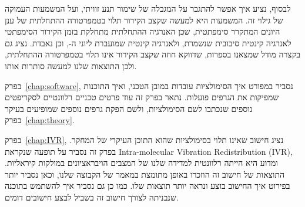 {לבסוף, נציע איך אפשר להתגבר על המגבלה של שימור תנע זוויתי, ועל המשמעות העמוקה של גילוי זה. המשמעות היא למעשה שקצב הקירור תלוי בטמפרטורה ההתחלתית של ענן היונים המתקרר סימפתטית, שכן האנרגיה ההתחלתית מתחלקת בזמן הקירור הסימפתטי לאנרגיה קינטית סיבובית שנשמרת, ולאנרגיה קינטית שמועברת ליוני ה-\textenglish{}, וכן נאבדת. נציג גם בקצרה מודל שמצאנו בספרות\cite{BabaWakiSympatheticCooling}, שדווקא חוזה שקצב הקירור אינו תלוי בטמפרטורה ההתחלתית, ולכן התוצאות שלנו למעשה סותרות אותו.

בפרק~\ref{chap:software}, נסביר במפורט איך הסימולציות עובדות במובן הטכני, ואיך התוכנות שמפיקות את הגרפים פועלות. נתאר בפרק זה עוד פרטים טכניים רלוונטיים לסקריפטים נוספים שנכתבו לשם הסימולציות, ולשם הפקת גרפים נוספים שמופיעים בעיקר בפרק~\ref{chap:theory}.

בפרק~\textenglish{\ref{chap:IVR}}, נציג חישוב שאינו תלוי בסימולציות שהוא התוכן העיקרי של המחקר. בפרק זה נסביר על תופעה שנקראת \textenglish{Intra-molecular Vibration Redistribution (IVR)}, ומדוע היא הייתה רלוונטית למדידה שלנו של המצבים הויבראציונים במולקות קיראליות. התוצאות של חישוב זה הוזכרו באופן מתומצת במאמר של הקבוצה שלנו\cite{IVR_article}, וכאן נסביר יותר בפירוט איך החישוב בוצע ונראה יותר תוצאות שלו. כמו כן גם נסביר איך להשתמש בתוכנה שנבניתה לצורך חישוב זה בשביל לבצע חישובים דומים.

} %
